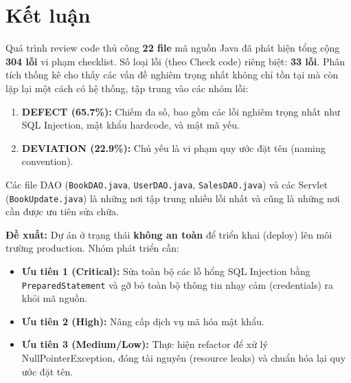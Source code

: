 \chapter{Kết luận}

Quá trình review code thủ công \textbf{22 file} mã nguồn Java đã phát hiện tổng cộng \textbf{304 lỗi} vi phạm checklist.
Số loại lỗi (theo Check code) riêng biệt: \textbf{33 lỗi}.
Phân tích thống kê cho thấy các vấn đề nghiêm trọng nhất không chỉ tồn tại mà còn lặp lại một cách có hệ thống, tập trung vào các nhóm lỗi:
\begin{enumerate}
    \item \textbf{DEFECT (65.7\%):} Chiếm đa số, bao gồm các lỗi nghiêm trọng nhất như SQL Injection, mật khẩu hardcode, và mật mã yếu.
    \item \textbf{DEVIATION (22.9\%):} Chủ yếu là vi phạm quy ước đặt tên (naming convention).
\end{enumerate}

Các file DAO (\texttt{BookDAO.java}, \texttt{UserDAO.java}, \texttt{SalesDAO.java}) và các Servlet (\texttt{BookUpdate.java}) là những nơi tập trung nhiều lỗi nhất và cũng là những nơi cần được ưu tiên sửa chữa.

\textbf{Đề xuất:} Dự án ở trạng thái \textbf{không an toàn} để triển khai (deploy) lên môi trường production.
Nhóm phát triển cần:
\begin{itemize}
    \item \textbf{Ưu tiên 1 (Critical):} Sửa toàn bộ các lỗ hổng SQL Injection bằng \texttt{PreparedStatement} và gỡ bỏ toàn bộ thông tin nhạy cảm (credentials) ra khỏi mã nguồn.
    \item \textbf{Ưu tiên 2 (High):} Nâng cấp dịch vụ mã hóa mật khẩu.
    \item \textbf{Ưu tiên 3 (Medium/Low):} Thực hiện refactor để xử lý NullPointerException, đóng tài nguyên (resource leaks) và chuẩn hóa lại quy ước đặt tên.
\end{itemize}